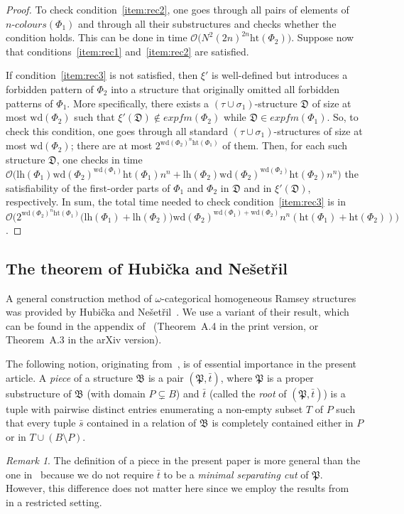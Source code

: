 \documentclass[oneside,reqno,12pt]{amsart}
\theoremstyle{plain}
\theoremstyle{remark}
\newtheorem{remark}[thm]{Remark}
\newcommand{\struct}[1]{\mathfrak{#1}}
\newcommand{\efm}{\ensuremath{\mathit{expfm}}\xspace}
\newcommand{\colours}{\ensuremath{n\text{-}\mathit{colours}}}
\newcommand{\hh}{\ensuremath{\mathrm{ht}}\xspace}
\newcommand{\lh}{\ensuremath{\mathrm{lh}}\xspace}
\newcommand{\wh}{\ensuremath{\mathrm{wd}}\xspace}
\begin{document}
{\begin{proof}
To check condition~\eqref{item:rec2}, one goes through all pairs of elements of $\colours(\Phi_1)$ and through all their substructures and checks whether the condition holds. 
This can be done in time $\mathcal{O}\bigl(N^2 (2n)^{2n}\hh(\Phi_2)\bigr)$. 
Suppose now that conditions~\eqref{item:rec1} and~\eqref{item:rec2} are satisfied.



If condition~\eqref{item:rec3} is not satisfied, then $\xi'$ is well-defined but introduces a forbidden pattern of $\Phi_2$ into a structure that originally omitted all forbidden patterns of $\Phi_1$.
More specifically, there exists a $(\tau\cup \sigma_1)$-structure $\struct{D}$ of size at most $\wh(\Phi_2)$ such that $\xi'(\struct{D})\notin \efm(\Phi_2)$ while $\struct{D} \in \efm(\Phi_1)$.
So, to check this condition, one goes through all standard $(\tau\cup \sigma_1)$-structures of size at most $\wh(\Phi_2)$; there are at most $2^{\wh(\Phi_2)^n\hh(\Phi_1)}$ of them.
Then, for each such structure $\struct{D}$, one checks in time $\mathcal{O}\bigl(\lh(\Phi_1)\wh(\Phi_2)^{\wh(\Phi_1)}\hh(\Phi_1)n^n+\lh(\Phi_2)\wh(\Phi_2)^{\wh(\Phi_2)}\hh(\Phi_2)n^n\bigr)$ the satisfiability of the first-order parts of $\Phi_1$ and $\Phi_2$ in $\struct{D}$ and in $\xi'(\struct{D})$, respectively.
In sum, the total time needed to check condition~\eqref{item:rec3} is in $\mathcal{O}\bigl(2^{\wh(\Phi_2)^n\hh(\Phi_1)}\bigl(\lh(\Phi_1)+\lh(\Phi_2)\bigr)\wh(\Phi_2)^{\wh(\Phi_1)+\wh(\Phi_2)}n^n(\hh(\Phi_1)+\hh(\Phi_2))\bigr)$.
\end{proof}

\subsection{The theorem of Hubi\v{c}ka and Ne\v{s}et\v{r}il}

A general construction method  of $\omega$-categorical homogeneous Ramsey structures was  provided by Hubi\v{c}ka and Ne\v{s}et\v{r}il~\cite{hubickanesetril2019}.
We use a variant of their result, which can be found in the appendix of~\cite{bodirsky2018_article} (Theorem~A.4 in the print version, or Theorem~A.3 in the arXiv version).


The following notion, originating from~\cite{hubicka2015}, is of essential importance in the present article.
A \emph{piece} of a structure $\struct{B}$ is a pair $(\struct{P},\bar{t})$, where $\struct{P}$ is a proper substructure of $\struct{B}$ (with domain $P \subsetneq B$) and $\bar t$ (called the \emph{root} of $(\struct{P},\bar{t})$) is a tuple with pairwise distinct entries enumerating a non-empty subset $T$ of $P$  such that every tuple $\bar s$ contained in a relation of $\struct B$ is completely contained either in $P$ or in $T\cup (B\setminus P)$.  
\begin{remark} The definition of a piece in the present paper is more general than the one in~\cite{hubicka2015} because we do not require $\bar t$ to be a \emph{minimal separating cut} of $\struct{P}$. However, this difference does not matter here since we employ the results from~\cite{hubicka2015} in a restricted setting.
\end{remark}

}
\end{document}

